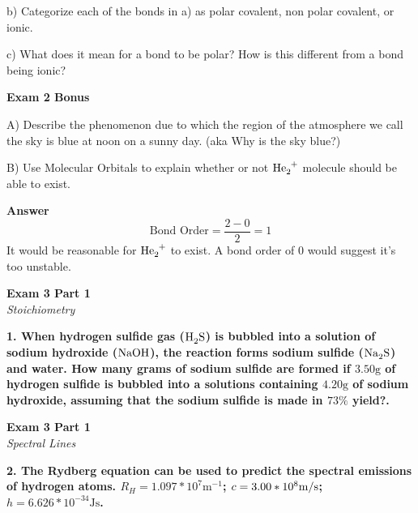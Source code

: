 \documentclass{article}
\begin{document}
    b)  Categorize each of the bonds in a) as polar covalent, non polar covalent, or ionic.

    c) What does it mean for a bond to be polar? How is this different from a bond being ionic?
    \pagebreak

    \begin{center}
        \textbf{Exam 2 Bonus}\\
    \end{center}

    A) Describe the phenomenon due to which the region of the atmosphere we call the sky is blue at noon on a sunny day. (aka Why is the sky blue?)

    B) Use Molecular Orbitals to explain whether or not $\ce{He2+}$ molecule should be able to exist.

    \textbf{Answer}\\
    $$\text{Bond Order} = \dfrac{2 - 0}{2} = 1$$
    It would be reasonable for $\ce{He2+}$ to exist. A bond order of 0 would suggest it's too unstable.

    \pagebreak


    \begin{center}
        \textbf{Exam 3 Part 1}\\
        \textit{Stoichiometry}
    \end{center}
    \textbf{1. When hydrogen sulfide gas ($\ce{H2S}$) is bubbled into a solution of sodium hydroxide ($\ce{NaOH}$), the reaction forms sodium sulfide ($\ce{Na2S}$) and water. How many grams of sodium sulfide are formed if $3.50 \si{\gram}$ of hydrogen sulfide is bubbled into a solutions containing $4.20 \si{\gram}$ of sodium hydroxide, assuming that the sodium sulfide is made in $73\%$ yield?.}

    \pagebreak

    \begin{center}
        \textbf{Exam 3 Part 1}\\
        \textit{Spectral Lines}
    \end{center}
    \textbf{2. The Rydberg equation can be used to predict the spectral emissions of hydrogen atoms. $R_{H} = 1.097 * 10^{7}  \si{\meter^{-1}}$; $c = 3.00 * 10^{8} \si[per-mode=symbol]{\meter\per\second}$; $h = 6.626 * 10^{-34} \si{\joule} \si{\second}$.}
\end{document}
